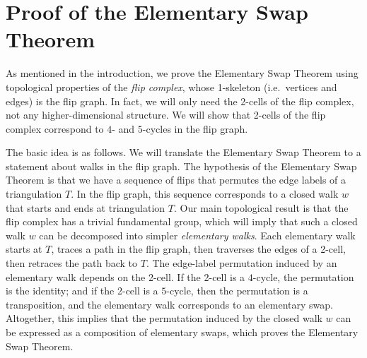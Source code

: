 
\section{Proof of the Elementary Swap Theorem}
\label{sec:topology}

As mentioned in the introduction, we prove the Elementary Swap Theorem using topological properties of the \emph{flip complex}, whose 1-skeleton (i.e.~vertices and edges) is the flip graph. 
In fact, we will only need the 2-cells of the flip complex, not any higher-dimensional structure. 
We will show that 2-cells of the flip complex correspond to $4$- and $5$-cycles in the flip graph.

The basic idea is as follows.  We will translate the Elementary Swap Theorem to a statement about walks in the flip graph.  
The hypothesis of the Elementary Swap Theorem is that we have a sequence of flips that permutes the edge labels of a triangulation $T$.  In the flip graph, this sequence corresponds to a closed walk $w$ that starts and ends at triangulation $T$.   Our main topological result 
is that the flip complex has a trivial fundamental group, which will imply that such a closed walk $w$ can be decomposed into simpler \emph{elementary walks}.  Each elementary walk starts at $T$, traces a path in the flip graph, then traverses the edges of a 2-cell, then retraces the path back to $T$. 
The edge-label permutation induced by an elementary walk depends on the 2-cell.
If the 2-cell is a $4$-cycle, the permutation is the identity; and if the 2-cell is a $5$-cycle, then the permutation is a transposition, and the elementary walk corresponds to an elementary swap.  Altogether, this implies that the permutation induced by the closed walk $w$ can be expressed as a composition of elementary swaps, which proves the Elementary Swap Theorem.

